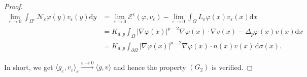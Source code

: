 \documentclass[12pt, reqno]{amsart}%
\theoremstyle{plain}  %
\theoremstyle{definition}  %
\numberwithin{equation}{section}
\renewcommand{\d}{\mathrm{d}}
\newcommand{\eps}{\varepsilon}
\begin{document}
\begin{proof}
\begin{align*}
\lim_{\eps\to0}\int_{\Omega^c} \mathcal{N}_\eps \varphi(y)v_\eps(y)\d y
&=
\lim_{\eps\to0} \mathcal{E}^\eps(\varphi, v_\eps )
-\lim_{\eps\to0} \int_{\Omega}L_{\eps}\varphi(x)v_\eps(x)\d x\\
&= K_{d,p} \int_{\Omega}|\nabla\varphi(x)|^{p-2}\nabla\varphi(x)\cdot \nabla v(x)-\Delta_p\varphi(x) v(x)\d x\\
&= K_{d,p}\int_{\partial\Omega} |\nabla\varphi(x)|^{p-2}\nabla\varphi(x)\cdot n(x) v(x)\,\d\sigma(x).
\end{align*}

\noindent In short, we get $\langle g_\eps, v_\eps \rangle_\eps\xrightarrow{\eps\to0} \langle g,v\rangle$ and hence the  property $(G_2)$ is verified.
\end{proof}
\end{document}
